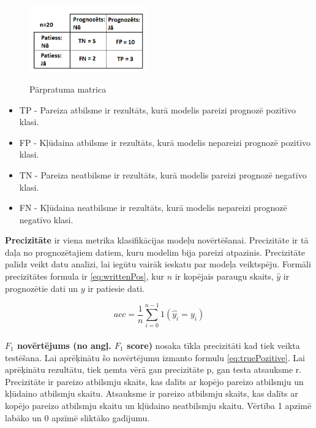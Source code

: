 \documentclass[12pt,paper=A4]{report}
\begin{document}
\begin{figure}[H] \centering
\includegraphics[width=0.45\textwidth]{confmat} 
\caption{Pārpratuma matrica} \cite{bptt}  \label{confMat} 
\end{figure}

\begin{itemize}
\item TP - Pareiza atbilsme ir rezultāts, kurā modelis pareizi prognozē pozitīvo klasi.

\item FP - Kļūdaina atbilsme ir rezultāts, kurā modelis nepareizi prognozē pozitīvo klasi. 

\item TN - Pareiza neatbilsme ir rezultāts, kurā modelis pareizi prognozē negatīvo klasi.

\item FN - Kļūdaina neatbilsme ir rezultāts, kurā modelis nepareizi prognozē negatīvo klasi.
\end{itemize}



 \textbf{Precizitāte} ir viena metrika klasifikācijas modeļu novērtēšanai. Precizitāte ir tā daļa no prognozētajiem datiem, kuru modelim bija pareizi atpazinis. Precizitāte palīdz veikt datu analīzi, lai iegūtu vairāk ieskatu par modeļa veiktspēju. Formāli precizitātes formula ir \ref{eq:writtenPos}, kur $n$ ir kopējais paraugu skaits, $\hat{y}$ ir prognozētie dati un $y$ ir patiesie dati.
 
\begin{equation}
acc = \frac{1}{n} \sum_{i=0}^{n-1} 1(\hat{y_i}=y_i)
\label{eq:writtenPos}
\end{equation}\\

 \textbf{$F_1$ novērtējums (no angļ. $F_1$ score)} nosaka tīkla precizitāti kad tiek veikta testēšana. Lai aprēķinātu šo novērtējumu izmanto formulu \ref{eq:truePozitive}. Lai aprēķinātu rezultātu, tiek ņemta vērā gan precizitāte p, gan testa atsauksme r. Precizitāte ir pareizo atbilsmju skaits, kas dalīts ar kopējo pareizo atbilsmju un kļūdaino atbilsmju skaitu. Atsauksme ir pareizo atbilsmju skaits, kas dalīts ar kopējo pareizo atbilsmju skaitu un kļūdaino neatbilsmju skaitu. Vērtība 1 apzīmē labāko un 0 apzīmē sliktāko gadījumu.
\end{document}
